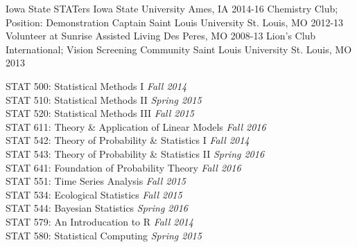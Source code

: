 \documentclass[11pt, a4paper]{awesome-cv}
\begin{document}
  \begin{cvhonors}
  \cvhonor
    {Iowa State STATers}
    {Iowa State University}
    {Ames, IA}
    {2014-16}
  \cvhonor
    {Chemistry Club; Position: Demonstration Captain}
    {Saint Louis University}
    {St. Louis, MO}
    {2012-13}
  \cvhonor
    {Volunteer at Sunrise Assisted Living}
    {}
    {Des Peres, MO}
    {2008-13}
  \cvhonor
    {Lion's Club International; Vision Screening Community}
    {Saint Louis University}
    {St. Louis, MO}
    {2013}
 \end{cvhonors}


STAT 500: Statistical Methods I \dotfill \textit{\small{Fall 2014}}\\
STAT 510: Statistical Methods II \dotfill \textit{\small{Spring 2015}}\\
STAT 520: Statistical Methods III \dotfill \textit{\small{Fall 2015}}\\
STAT 611: Theory \& Application of Linear Models \dotfill \textit{\small{Fall 2016}}\\
STAT 542: Theory of Probability \& Statistics I \dotfill \textit{\small{Fall 2014}}\\
STAT 543: Theory of Probability \& Statistics II \dotfill \textit{\small{Spring 2016}}\\
STAT 641: Foundation of Probability Theory \dotfill \textit{\small{Fall 2016}}\\
STAT 551: Time Series Analysis \dotfill \textit{\small{Fall 2015}}\\
STAT 534: Ecological Statistics \dotfill \textit{\small{Fall 2015}}\\
STAT 544: Bayesian Statistics \dotfill \textit{\small{Spring 2016}}\\
STAT 579: An Introducation to R \dotfill \textit{\small{Fall 2014}}\\
STAT 580: Statistical Computing \dotfill \textit{\small{Spring 2015}}
\end{document}
